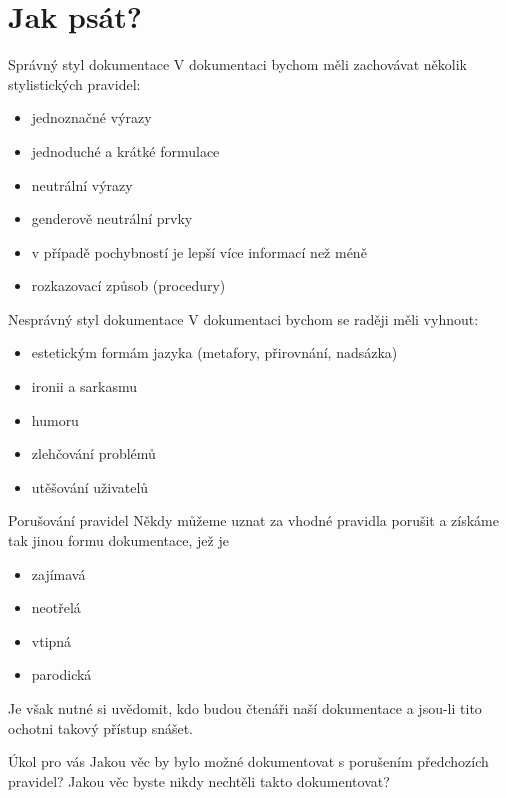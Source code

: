\documentclass[12pt]{beamer}
\begin{document}
	\section{Jak psát?}

	\begin{frame}{Správný styl dokumentace}
	V dokumentaci bychom měli zachovávat několik stylistických pravidel:
	\begin{itemize}
		\item jednoznačné výrazy
		\item jednoduché a krátké formulace
		\item neutrální výrazy
		\item genderově neutrální prvky
		\item v případě pochybností je lepší více informací než méně
		\item rozkazovací způsob (procedury)
	\end{itemize}
	\end{frame}

	\begin{frame}{Nesprávný styl dokumentace}
	V dokumentaci bychom se raději měli vyhnout:
	\begin{itemize}
		\item estetickým formám jazyka (metafory, přirovnání, nadsázka)
		\item ironii a sarkasmu
		\item humoru
		\item zlehčování problémů
		\item utěšování uživatelů
	\end{itemize}
	\end{frame}

	\begin{frame}{Porušování pravidel}
	Někdy můžeme uznat za vhodné pravidla porušit a získáme tak jinou formu dokumentace, jež je
	\begin{itemize}
		\item zajímavá
		\item neotřelá
		\item vtipná
		\item parodická
	\end{itemize}
	Je však nutné si uvědomit, kdo budou čtenáři naší dokumentace a jsou-li tito ochotni takový přístup snášet.
	\end{frame}

	\begin{frame}{Úkol pro vás}
			Jakou věc by bylo možné dokumentovat s porušením předchozích pravidel? Jakou věc byste nikdy nechtěli takto dokumentovat?
	\end{frame}
\end{document}
